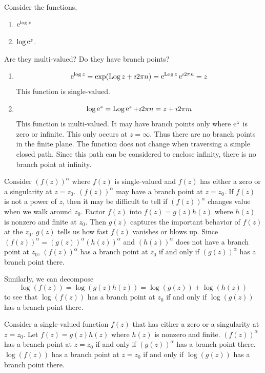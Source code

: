 \begin{Example}
  Consider the functions,
  \begin{enumerate}
  \item $\mathop{\mathrm{e}}\nolimits^{\log z}$
  \item $\log \mathop{\mathrm{e}}\nolimits^z$. 
  \end{enumerate}
  Are they multi-valued?  Do they have branch points?

  \begin{enumerate}
  \item
    \[ 
    \mathop{\mathrm{e}}\nolimits^{\log z} = \exp( \mathop{\mathrm{Log}}\nolimits z + \imath 2 \pi n ) = \mathop{\mathrm{e}}\nolimits^{\mathop{\mathrm{Log}}\nolimits z} \mathop{\mathrm{e}}\nolimits^{\imath 2 \pi n} = z 
    \]
    This function is single-valued.
  \item
    \[ 
    \log \mathop{\mathrm{e}}\nolimits^z = \mathop{\mathrm{Log}}\nolimits \mathop{\mathrm{e}}\nolimits^z + \imath 2 \pi n = z + \imath 2 \pi m 
    \]
    This function is multi-valued.  It may have branch points only where $\mathop{\mathrm{e}}\nolimits^z$
    is zero or infinite.  This only occurs at $z = \infty$.
    Thus there are no branch points in the finite plane.  The function does
    not change when traversing a simple closed path.  Since this path can
    be considered to enclose infinity, there is no branch point at infinity.
  \end{enumerate}
\end{Example}






Consider $(f(z))^\alpha$ where $f(z)$ is single-valued and $f(z)$ has either a 
zero or a singularity at $z = z_0$.  $(f(z))^\alpha$ may have a branch point at
$z = z_0$.  If $f(z)$ is not a power of $z$, then it may be difficult to tell
if $(f(z))^\alpha$ changes value when we walk around $z_0$.
Factor $f(z)$ into $f(z) = g(z) h(z)$ where $h(z)$ is nonzero and finite 
at $z_0$.  Then $g(z)$ captures the important behavior of $f(z)$ at the 
$z_0$.  $g(z)$ tells us how fast $f(z)$ vanishes or blows up.  
Since $(f(z))^\alpha = (g(z))^\alpha  (h(z))^\alpha$ and $(h(z))^\alpha$
does not have a branch point at $z_0$, $(f(z))^\alpha$ has a 
branch point at $z_0$ if and only if $(g(z))^\alpha$ has a branch point 
there.

Similarly, we can decompose 
\[
\log(f(z)) = \log(g(z) h(z)) = \log(g(z)) + \log(h(z))
\]
to see that $\log(f(z))$ has a branch point at $z_0$ if and only if
$\log(g(z))$ has a branch point there.





\begin{Result}
  Consider a single-valued function $f(z)$ that has either a zero or
  a singularity at $z = z_0$.  Let $f(z) = g(z) h(z)$ where $h(z)$
  is nonzero and finite.  $(f(z))^\alpha$ has a branch point at $z =
  z_0$ if and only if $(g(z))^\alpha$ has a branch point there.
  $\log(f(z))$ has a branch point at $z = z_0$ if and only if
  $\log(g(z))$ has a branch point there.
\end{Result}








